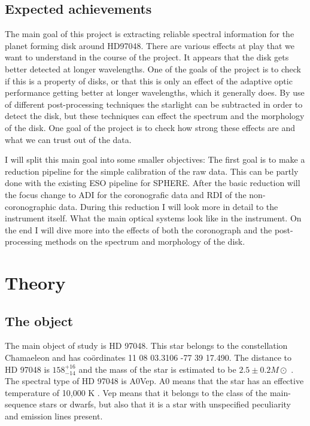 \documentclass[twoside,single]{lion-msc}
\begin{document}
\section{Expected achievements}
The main goal of this project is extracting reliable spectral information for the planet forming disk around HD97048. There are various effects at play that we want to understand in the course of the project. It appears that the disk gets better detected at longer wavelengths. One of the goals of the project is to check if this is a property of disks, or that this is only an effect of the adaptive optic performance getting better at longer wavelengths, which it generally does. By use of different post-processing techniques the starlight can be subtracted in order to detect the disk, but these techniques can effect the spectrum and the morphology of the disk. One goal of the project is to check how strong these effects are and what we can trust out of the data.
\bigskip

I will split this main goal into some smaller objectives: The first goal is to make a reduction pipeline for the simple calibration of the raw data. This can be partly done with the existing ESO pipeline for SPHERE. After the basic reduction will the focus change to ADI for the coronografic data and RDI of the non-coronographic data. During this reduction I will look more in detail to the instrument itself. What the main optical systems look like in the instrument. On the end I will dive more into the effects of both the coronograph and the post-processing methods on the spectrum and morphology of the disk.

\chapter{Theory}
\section{The object}
The main object of study is HD 97048. This star belongs to the constellation Chamaeleon and has co\"ordinates 11 08 03.3106 -77 39 17.490. The distance to HD 97048 is $158^{+16}_{-14}$  \cite{VanLeeuwen2007} and the mass of the star is estimated to be $2.5\pm 0.2 M\odot$ \cite{VanDenAncker1998}. The spectral type of HD 97048 is A0Vep. A0 means that the star has an effective temperature of 10,000 K \cite{Maaskant2013}. Vep means that it belongs to the class of the main-sequence stars or dwarfs, but also that it is a star with unspecified peculiarity and emission lines present.
\bigskip
\end{document}
